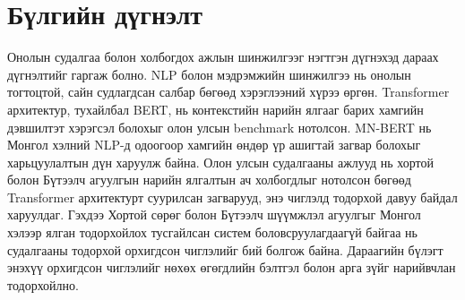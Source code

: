 
\section{Бүлгийн дүгнэлт}

Онолын судалгаа болон холбогдох ажлын шинжилгээг нэгтгэн дүгнэхэд дараах
дүгнэлтийг гаргаж болно. NLP болон мэдрэмжийн шинжилгээ нь онолын тогтоцтой,
сайн судлагдсан салбар бөгөөд хэрэглээний хүрээ өргөн. Transformer архитектур,
тухайлбал BERT, нь контекстийн нарийн ялгааг барих хамгийн дэвшилтэт хэрэгсэл
болохыг олон улсын benchmark нотолсон. MN-BERT нь Монгол хэлний NLP-д одоогоор
хамгийн өндөр үр ашигтай загвар болохыг харьцуулалтын дүн харуулж байна.
Олон улсын судалгааны ажлууд нь хортой болон Бүтээлч агуулгын нарийн ялгалтын
ач холбогдлыг нотолсон бөгөөд Transformer архитектурт суурилсан загварууд, энэ
чиглэлд тодорхой давуу байдал харуулдаг. Гэхдээ Хортой сөрөг болон Бүтээлч шүүмжлэл
агуулгыг Монгол хэлээр ялган тодорхойлох тусгайлсан систем боловсруулагдаагүй
байгаа нь судалгааны тодорхой орхигдсон чиглэлийг бий болгож байна. Дараагийн бүлэгт
энэхүү орхигдсон чиглэлийг нөхөх өгөгдлийн бэлтгэл болон арга зүйг нарийвчлан
тодорхойлно.
